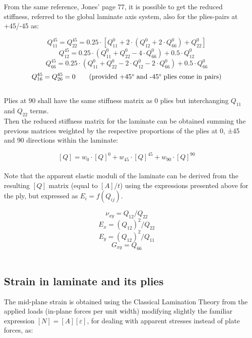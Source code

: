 \documentclass[a4paper,11pt]{article}
\begin{document}
From the same reference, Jones' page 77, it is possible to get the reduced stiffness, referred to the global laminate axis system, also for the plies-pairs at +45\textdegree/-45\textdegree{} as:

	$$	Q^{45}_{11} = Q^{45}_{22} = 0.25 \cdot [Q^{0}_{11} + 2 \cdot (Q^{0}_{12} + 2 \cdot Q^{0}_{66}) + Q^{0}_{22} ]	$$
	$$	Q^{45}_{12} = 0.25 \cdot (Q^{0}_{11} + Q^{0}_{22} - 4 \cdot Q^{0}_{66}) + 0.5 \cdot Q^{0}_{12}	$$
	$$	Q^{45}_{66} = 0.25 \cdot (Q^{0}_{11} + Q^{0}_{22} - 2 \cdot Q^{0}_{12} - 2 \cdot Q^{0}_{66}) + 0.5 \cdot Q^{0}_{66}	$$
	$$	Q^{45}_{16} = Q^{45}_{26} = 0 \qquad \mbox{(provided +45\textdegree{} and -45\textdegree{} plies come in pairs)}	$$
\\

Plies at 90\textdegree{} shall have the same stiffness matrix as 0\textdegree{} plies but interchanging $Q_{11}$ and $Q_{22}$ terms.
\\

Then the reduced stiffness matrix for the laminate can be obtained summing the previous matrices weighted by the respective proportions of the plies at 0\textdegree, ±45\textdegree{} and 90\textdegree{} directions within the laminate:

	$$	[Q] = w_{0} \cdot [Q]^{0} + w_{45} \cdot [Q]^{45} + w_{90} \cdot [Q]^{90}	$$
\\

Note that the apparent elastic moduli of the laminate can be derived from the resulting $[Q]$ matrix (equal to $[A]/t$) using the expressions presented above for the ply, but expressed as $E_{i} = f(Q_{ij})$.

	$$	\nu_{xy} = Q_{12} / Q_{22}		$$
	$$	E_{x} = (Q_{12})^{2} / Q_{22}	$$
	$$	E_{y} = (Q_{12})^{2} / Q_{11}	$$
	$$	G_{xy} = Q_{66}					$$
\\


\subsection{Strain in laminate and its plies}

The mid-plane strain is obtained using the Classical Lamination Theory from the applied loads (in-plane forces per unit width)
modifying slightly the familiar expression $[N] = [A] [\varepsilon]$, for dealing with apparent stresses instead of plate forces, as:
\end{document}

